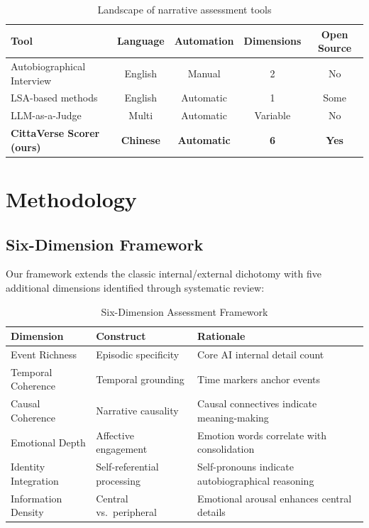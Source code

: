 \documentclass[11pt]{article}
\begin{document}
\begin{table}[h]
\centering
\caption{Landscape of narrative assessment tools}
\label{tab:gap}
\begin{tabular}{lcccc}
\toprule
\textbf{Tool} & \textbf{Language} & \textbf{Automation} & \textbf{Dimensions} & \textbf{Open Source} \\
\midrule
Autobiographical Interview & English & Manual & 2 & No \\
LSA-based methods & English & Automatic & 1 & Some \\
LLM-as-a-Judge & Multi & Automatic & Variable & No \\
\textbf{CittaVerse Scorer (ours)} & \textbf{Chinese} & \textbf{Automatic} & \textbf{6} & \textbf{Yes} \\
\bottomrule
\end{tabular}
\end{table}


\section{Methodology}\label{sec:methodology}

\subsection{Six-Dimension Framework}

Our framework extends the classic internal/external dichotomy \citep{levine2002} with five additional dimensions identified through systematic review:

\begin{table}[h]
\centering
\caption{Six-Dimension Assessment Framework}
\label{tab:dimensions}
\begin{tabular}{lll}
\toprule
\textbf{Dimension} & \textbf{Construct} & \textbf{Rationale} \\
\midrule
Event Richness & Episodic specificity & Core AI internal detail count \\
Temporal Coherence & Temporal grounding & Time markers anchor events \\
Causal Coherence & Narrative causality & Causal connectives indicate meaning-making \\
Emotional Depth & Affective engagement & Emotion words correlate with consolidation \\
Identity Integration & Self-referential processing & Self-pronouns indicate autobiographical reasoning \\
Information Density & Central vs.\ peripheral & Emotional arousal enhances central details \\
\bottomrule
\end{tabular}
\end{table}
\end{document}
